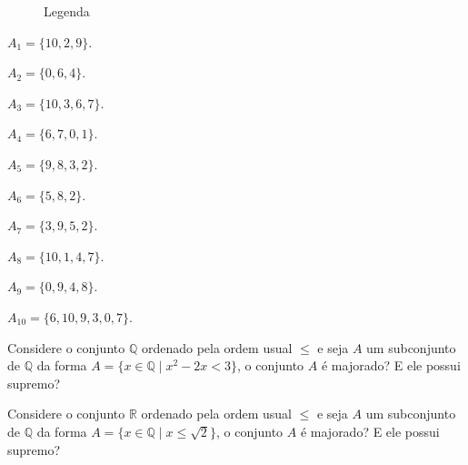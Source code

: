 \begin{figure}[h]
	\centering
	\caption{Legenda}
	\label{fig:ExercicioDePoset18}
\end{figure}

\begin{exerList}
	\item $A_1 = \{10, 2, 9\}$.
	\item $A_2= \{0, 6, 4\}$.
	\item $A_3 = \{10, 3, 6, 7\}$.
	\item $A_4 = \{6, 7, 0, 1\}$.
	\item $A_5 = \{9, 8, 3, 2\}$.
	\item $A_6 = \{5, 8, 2\}$.
	\item $A_7 = \{3, 9, 5, 2\}$.
	\item $A_8 = \{10, 1, 4, 7\}$.
	\item $A_9 = \{0,  9, 4, 8\}$.
	\item $A_{10} = \{6, 10, 9, 3, 0, 7\}$.
\end{exerList}

\begin{questao}\label{test:EquivalenciaOrdem18-2}
	Considere o conjunto $\mathbb{Q}$ ordenado pela ordem usual $\leq$ e seja $A$ um subconjunto de $\mathbb{Q}$ da forma $A = \{x \in \mathbb{Q} \mid x^2 - 2x < 3\}$, o conjunto $A$ é majorado? E ele possui supremo?
\end{questao}

\begin{questao}\label{test:EquivalenciaOrdem18-3}
	Considere o conjunto $\mathbb{R}$ ordenado pela ordem usual $\leq$ e seja  $A$ um subconjunto de $\mathbb{Q}$ da forma $A = \{x \in \mathbb{Q} \mid x \leq \sqrt{2}\}$, o conjunto $A$ é majorado? E ele possui supremo?
\end{questao}

